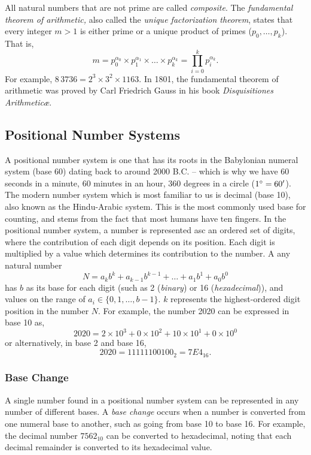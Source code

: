 \documentclass[11pt,twocolumn]{article}
\begin{document}
All natural numbers that are not prime are called \emph{composite}.
The \emph{fundamental theorem of arithmetic,}
also called the \emph{unique factorization theorem},
states that every integer $m>1$ is either prime or a unique
product of primes ($p_0, \ldots, p_k$).
That is,
$$
m = p_0^{\alpha_0} \times p_1^{\alpha_1} \times \ldots \times p_k^{\alpha_k}
= \prod_{i=0}^{k} p_i^{\alpha_k}.
$$
For example, $8\,3736=2^3\times 3^2\times 1163$.
In 1801, the fundamental theorem of arithmetic was proved by Carl Friedrich Gauss in his book
\emph{Disquisitiones Arithmetic\ae{}}.

\subsection{Positional Number Systems}

A positional number system is one that has its roots in the Babylonian
numeral system (base 60) dating back to around 2000 B.C. --  which is
why we have 60 seconds in a minute, 60 minutes in
an hour, 360 degrees in a circle ($1\degree = 60'$).
The modern number system which is most familiar to us is
decimal (base 10), also known as the Hindu-Arabic system. This is
the most commonly used base for counting, and stems from the fact
that most humans have ten fingers. In the positional number
system, a number is represented asc an ordered set of digits, where
the contribution of each digit depends on its position. Each digit
is multiplied by a value which determines its contribution to the
number. A any natural number
$$
N = a_{k} b^{k}+a_{k-1} b^{k-1}+\ldots+a_{1} b^{1}+a_{0} b^{0}
$$
has $b$ as its base for each digit (such as 2 (\emph{binary}) or
16 (\emph{hexadecimal})), and values on the range of $a_{i}\in
\{0,1,\ldots,b-1\}$. $k$ represents the highest-ordered digit
position in the number $N$. For example, the number 2020 can be
expressed in base 10 as,
$$
2020 = 2 \times 10^{3} + 0 \times 10^{2} + 10 \times 10^{1} + 0 \times 10^{0}
$$
or alternatively, in base 2 and base 16,
$$2020 = 11111100100_{2} = 7E4_{16}.$$

\subsubsection{Base Change}

A single number found in a positional number system can be represented
in any number of different bases. A \emph{base change} occurs when
a number is converted from one numeral base to another, such as
going from base 10 to base 16. For example, the decimal number
$7562_{10}$ can be converted to hexadecimal, noting that each decimal
remainder is converted to its hexadecimal value.
\end{document}
